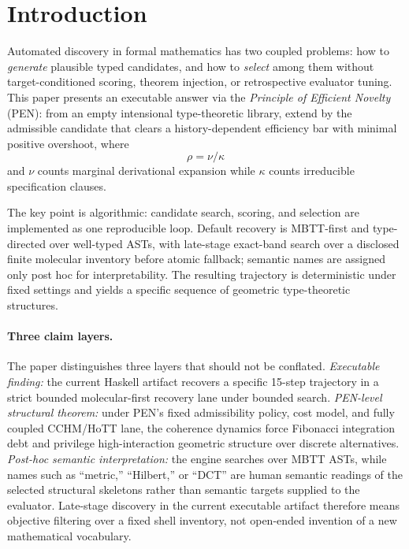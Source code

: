 \documentclass[11pt,a4paper]{article}
\theoremstyle{plain}
\theoremstyle{definition}
\theoremstyle{remark}
\begin{document}
\tableofcontents
\clearpage


\section{Introduction}
\label{sec:introduction}

Automated discovery in formal mathematics has two coupled problems: how to \emph{generate} plausible typed candidates, and how to \emph{select} among them without target-conditioned scoring, theorem injection, or retrospective evaluator tuning.
This paper presents an executable answer via the \emph{Principle of Efficient Novelty} (PEN): from an empty intensional type-theoretic library, extend by the admissible candidate that clears a history-dependent efficiency bar with minimal positive overshoot, where
\[
  \rho = \nu / \kappa
\]
and $\nu$ counts marginal derivational expansion while $\kappa$ counts irreducible specification clauses.

The key point is algorithmic: candidate search, scoring, and selection are implemented as one reproducible loop.
Default recovery is MBTT-first and type-directed over well-typed ASTs, with late-stage exact-band search over a disclosed finite molecular inventory before atomic fallback; semantic names are assigned only post hoc for interpretability.
The resulting trajectory is deterministic under fixed settings and yields a specific sequence of geometric type-theoretic structures.

\paragraph{Three claim layers.}
The paper distinguishes three layers that should not be conflated.
\emph{Executable finding:} the current Haskell artifact recovers a specific 15-step trajectory in a strict bounded molecular-first recovery lane under bounded search.
\emph{PEN-level structural theorem:} under PEN's fixed admissibility policy, cost model, and fully coupled CCHM/HoTT lane, the coherence dynamics force Fibonacci integration debt and privilege high-interaction geometric structure over discrete alternatives.
\emph{Post-hoc semantic interpretation:} the engine searches over MBTT ASTs, while names such as ``metric,'' ``Hilbert,'' or ``DCT'' are human semantic readings of the selected structural skeletons rather than semantic targets supplied to the evaluator.
Late-stage discovery in the current executable artifact therefore means objective filtering over a fixed shell inventory, not open-ended invention of a new mathematical vocabulary.
\end{document}
